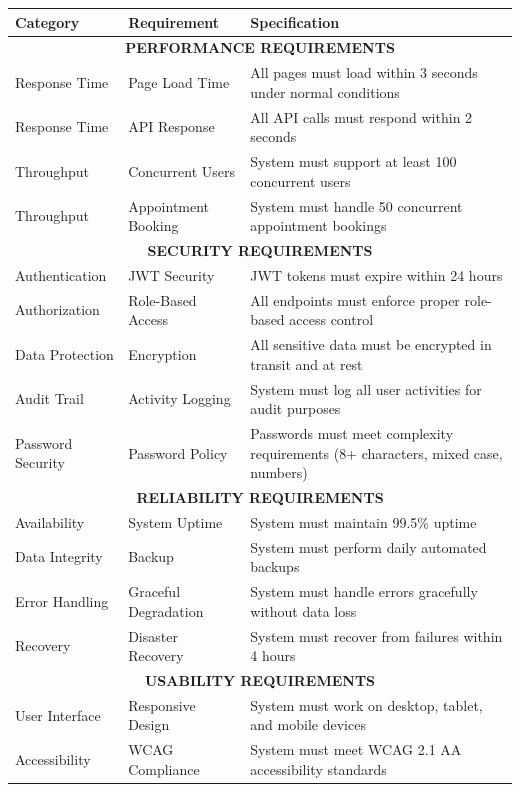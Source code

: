 \documentclass[12pt,a4paper]{article}
\begin{document}
\begin{longtable}{|p{2cm}|p{3cm}|p{9cm}|}
\hline
\textbf{Category} & \textbf{Requirement} & \textbf{Specification} \\
\hline
\multicolumn{3}{|c|}{\textbf{PERFORMANCE REQUIREMENTS}} \\
\hline
Response Time & Page Load Time & All pages must load within 3 seconds under normal conditions \\
\hline
Response Time & API Response & All API calls must respond within 2 seconds \\
\hline
Throughput & Concurrent Users & System must support at least 100 concurrent users \\
\hline
Throughput & Appointment Booking & System must handle 50 concurrent appointment bookings \\
\hline
\multicolumn{3}{|c|}{\textbf{SECURITY REQUIREMENTS}} \\
\hline
Authentication & JWT Security & JWT tokens must expire within 24 hours \\
\hline
Authorization & Role-Based Access & All endpoints must enforce proper role-based access control \\
\hline
Data Protection & Encryption & All sensitive data must be encrypted in transit and at rest \\
\hline
Audit Trail & Activity Logging & System must log all user activities for audit purposes \\
\hline
Password Security & Password Policy & Passwords must meet complexity requirements (8+ characters, mixed case, numbers) \\
\hline
\multicolumn{3}{|c|}{\textbf{RELIABILITY REQUIREMENTS}} \\
\hline
Availability & System Uptime & System must maintain 99.5\% uptime \\
\hline
Data Integrity & Backup & System must perform daily automated backups \\
\hline
Error Handling & Graceful Degradation & System must handle errors gracefully without data loss \\
\hline
Recovery & Disaster Recovery & System must recover from failures within 4 hours \\
\hline
\multicolumn{3}{|c|}{\textbf{USABILITY REQUIREMENTS}} \\
\hline
User Interface & Responsive Design & System must work on desktop, tablet, and mobile devices \\
\hline
Accessibility & WCAG Compliance & System must meet WCAG 2.1 AA accessibility standards \\

\end{longtable}
\end{document}
